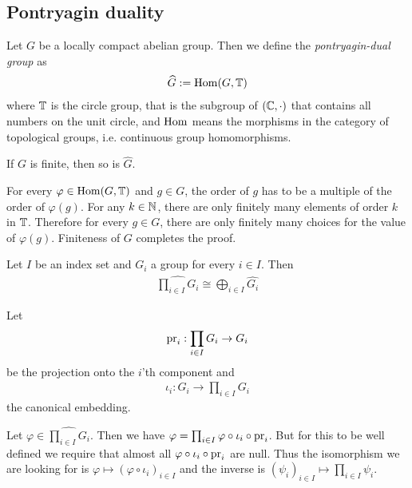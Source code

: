 \subsection{Pontryagin duality}

\begin{Definition}
	\label{the_zero_divisor_problem:pontryagin_duality:definition_pontryagin_duality}
	Let $G$ be a locally compact abelian group. Then we define the \emph{pontryagin-dual group} as
	\begin{align*}
		\widehat{G} := \operatorname{Hom}(G,\mathbb{T})
	\end{align*}
	where $\mathbb{T}$ is the circle group, that is the subgroup of $(\mathbb{C},\cdot)$ that contains all numbers on the unit circle, and $\operatorname{Hom}$ means the morphisms in the category of topological groups, i.e. continuous group homomorphisms.
\end{Definition}

\begin{Lemma}
	If $G$ is finite, then so is $\widehat{G}$.
\end{Lemma}

\proof
	For every $\varphi \in \operatorname{Hom}(G,\mathbb{T})$ and $g \in G$, the order of $g$ has to be a multiple of the order of $\varphi(g)$.
	For any $k \in \mathbb{N}$, there are only finitely many elements of order $k$ in $\mathbb{T}$.
	Therefore for every $g \in G$, there are only finitely many choices for the value of $\varphi(g)$.
	Finiteness of $G$ completes the proof.
\endproof

\begin{Lemma}
	\label{the_zero_divisor_problem:pontryagin_duality:lemma_dual_product}
	Let $I$ be an index set and $G_i$ a group for every $i \in I$. Then
	\begin{align*}
		\widehat{\prod_{i \in I} G_i} \cong \bigoplus_{i \in I} \widehat{G_i}
	\end{align*}
\end{Lemma}

\proof
	Let
	\begin{align*}
		\operatorname{pr}_i: \prod_{i \in I} G_i \to G_i
	\end{align*}
	be the projection onto the $i$'th component and
	\begin{align*}
		\iota_i: G_i \to \prod_{i \in I} G_i
	\end{align*}
	the canonical embedding.

	Let $\varphi \in \widehat{\prod_{i \in I} G_i}$. Then we have
	$\varphi = \prod_{i \in I} \varphi \circ \iota_i \circ \operatorname{pr}_i$.
	But for this to be well defined we require that almost all $\varphi \circ \iota_i \circ \operatorname{pr}_i$ are null.
	Thus the isomorphism we are looking for is $\varphi \mapsto (\varphi \circ \iota_i)_{i \in I}$ and the inverse is $(\psi_i)_{i \in I} \mapsto \prod_{i \in I} \psi_i$.
\endproof

